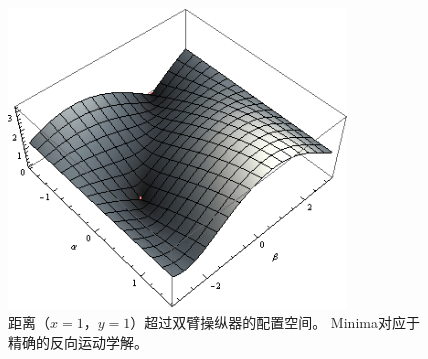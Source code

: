 \begin{figure}
	\centering
		\includegraphics[width=0.8\textwidth]{figs/inversekinematics}
	\caption{距离$（x = 1，y = 1）$超过双臂操纵器的配置空间。 Minima对应于精确的反向运动学解。}
	\label{fig:inversekinematics}
\end{figure}




